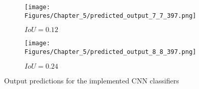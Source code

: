 \begin{figure} [h!]
\begin{subfigure}[b]{0.32\textwidth}
		\label{fig:GT_case_397}
	\end{subfigure}
	\hfill
	\begin{subfigure}[b]{0.32\textwidth}
		\centering
		\texttt{[image: Figures/Chapter\_5/predicted\_output\_7\_7\_397.png]}
		\caption{\(IoU=0.12\)}
		\label{fig:pred_7_7_case_397}
	\end{subfigure}
	\hfill
	\begin{subfigure}[b]{0.32\textwidth}
		\centering
		\texttt{[image: Figures/Chapter\_5/predicted\_output\_8\_8\_397.png]}
		\caption{\(IoU=0.24\)}
		\label{fig:pred_8_8_case_397}
	\end{subfigure}
	\caption{Output predictions for the implemented CNN classifiers}
	\label{}
\end{figure} 
\clearpage
